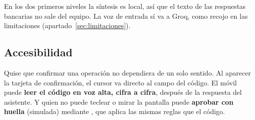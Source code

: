 En los dos primeros niveles la síntesis es local, así que el texto de las respuestas bancarias no sale del equipo. La voz de
entrada sí va a Groq, como recojo en las limitaciones (apartado~\ref{sec:limitaciones}).

\subsection{Accesibilidad}\label{sec:accesibilidad}

Quise que confirmar una operación no dependiera de un solo sentido. Al aparecer la tarjeta de confirmación, el
cursor va directo al campo del código. El móvil puede \textbf{leer el código en voz alta, cifra a cifra}, después de
la respuesta del asistente. Y quien no puede teclear o mirar la pantalla puede \textbf{aprobar con huella} (simulada)
mediante , que aplica las mismas reglas que el código.
